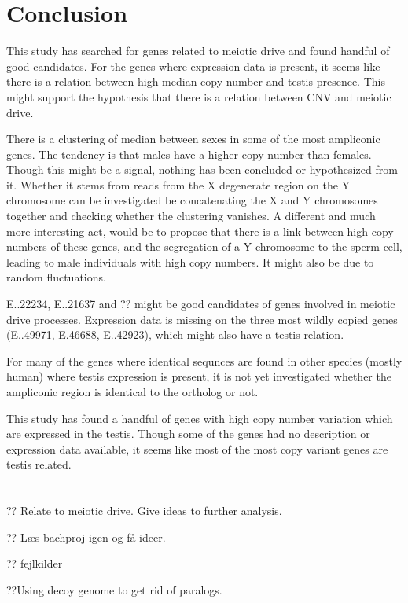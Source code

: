 \section*{Conclusion}

This study has searched for genes related to meiotic drive and found handful of good candidates. For the genes where expression data is present, it seems like there is a relation between high median copy number and testis presence. This might support the hypothesis that there is a relation between CNV and meiotic drive.

There is a clustering of median between sexes in some of the most ampliconic genes. The tendency is that males have a higher copy number than females. Though this might be a signal, nothing has been concluded or hypothesized from it. Whether it stems from reads from the X degenerate region on the Y chromosome can be investigated be concatenating the X and Y chromosomes together and checking whether the clustering vanishes. A different and much more interesting act, would be to propose that there is a link between high copy numbers of these genes, and the segregation of a Y chromosome to the sperm cell, leading to male individuals with high copy numbers. It might also be due to random fluctuations.

E..22234, E..21637 and ?? might be good candidates of genes involved in meiotic drive processes. Expression data is missing on the three most wildly copied genes (E..49971, E.46688, E..42923), which might also have a testis-relation.

For many of the genes where identical sequnces are found in other species (mostly human) where testis expression is present, it is not yet investigated whether the ampliconic region is identical to the ortholog or not.

This study has found a handful of genes with high copy number variation which are expressed in the testis. Though some of the genes had no description or expression data available, it seems like most of the most copy variant genes are testis related.
\\
\\
\\

?? Relate to meiotic drive. Give ideas to further analysis.

?? Læs bachproj igen og få ideer.

?? fejlkilder

??Using decoy genome to get rid of paralogs.


